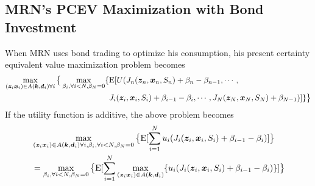\documentclass{article}[12pt letter]
\newcommand{\E}{\mathrm{E}}
\begin{document}
\subsection{MRN's PCEV Maximization with Bond Investment}

When MRN uses bond trading to optimize his consumption, his present certainty equivalent value maximization problem becomes
\begin{align*}
\max_{(\bm{z}_i\bm{x}_i) \in A(\bm{k},\bm{d}_i) \forall i}\big{\{} \max_{\beta_i,\forall i<N, \beta_N=0}\{&\E[U(J_n(\bm{z}_n,\bm{x}_n,S_n)+\beta_n-\beta_{n-1}, \cdots,\\ & J_i(\bm{z}_i,\bm{x}_i,S_i)+ \beta_{i-1} - \beta_i, \cdots,J_N(\bm{z}_N,\bm{x}_N,S_N)+\beta_{N-1} ) ] \}\big{\}}
\end{align*}
If the utility function is additive, the above problem becomes
\begin{align*}
&\max_{(\bm{z}_i\bm{x}_i) \in A(\bm{k},\bm{d}_i) \forall i, \beta_i,\forall i<N, \beta_N=0}\big{\{} \E[\sum_{i=1}^N u_i( J_i(\bm{z}_i,\bm{x}_i,S_i)+ \beta_{i-1} - \beta_i) ] \big{\}} \\
& =\max_{\beta_i,\forall i<N, \beta_N=0}\big{\{} \E [\sum_{i=1}^N \max_{(\bm{z}_i\bm{x}_i) \in A(\bm{k},\bm{d}_i)}\{u_i(J_i(\bm{z}_i,\bm{x}_i,S_i)+ \beta_{i-1} - \beta_i)\} ] \big{\}} 
\end{align*}



\newpage

%
\end{document}
